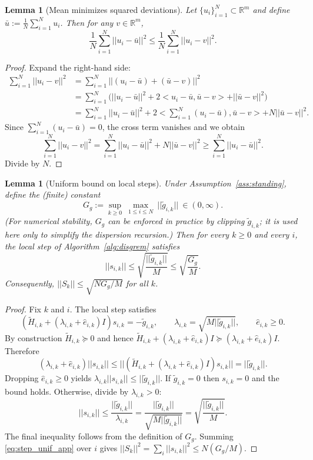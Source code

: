 \documentclass[11pt,a4paper]{article}
\def\norm#1{||#1||}%
\def\ip#1#2{<#1,#2>}%
\newtheorem{lemma}[theorem]{Lemma}
\newcommand{\R}{\mathbb{R}}
\newcommand{\ip}[2]{\left\langle #1,#2\right\rangle}
\newcommand{\norm}[1]{\left\|#1\right\|}
\begin{document}
	\begin{lemma}[Mean minimizes squared deviations]\label{lem:mean_minimizer_app}
		Let $\{u_i\}_{i=1}^N\subset\R^m$ and define $\bar u:=\frac1N\sum_{i=1}^N u_i$.
		Then for any $v\in\R^m$,
		\[
		\frac1N\sum_{i=1}^N\norm{u_i-\bar u}^2\le \frac1N\sum_{i=1}^N\norm{u_i-v}^2.
		\]
	\end{lemma}
	\begin{proof}
		Expand the right-hand side:
		\begin{align*}
			\sum_{i=1}^N\norm{u_i-v}^2
			&=\sum_{i=1}^N\norm{(u_i-\bar u)+(\bar u-v)}^2\\
			&=\sum_{i=1}^N\Big(\norm{u_i-\bar u}^2+2\ip{u_i-\bar u}{\bar u-v}+\norm{\bar u-v}^2\Big)\\
			&=\sum_{i=1}^N\norm{u_i-\bar u}^2+2\ip{\sum_{i=1}^N(u_i-\bar u)}{\bar u-v}+N\norm{\bar u-v}^2.
		\end{align*}
		Since $\sum_{i=1}^N(u_i-\bar u)=0$, the cross term vanishes and we obtain
		\[
		\sum_{i=1}^N\norm{u_i-v}^2=\sum_{i=1}^N\norm{u_i-\bar u}^2+N\norm{\bar u-v}^2\ge \sum_{i=1}^N\norm{u_i-\bar u}^2.
		\]
		Divide by $N$.
	\end{proof}
	
	\begin{lemma}[Uniform bound on local steps]\label{lem:step_bound_app}
		Under Assumption~\ref{ass:standing}, define the (finite) constant
		\[
		G_g:=\sup_{k\ge 0}\ \max_{1\le i\le N}\ \norm{\tilde g_{i,k}}\ \in(0,\infty).
		\]
		(For numerical stability, $G_g$ can be enforced in practice by clipping $\tilde g_{i,k}$; it is used here only to simplify the dispersion recursion.)
		Then for every $k\ge 0$ and every $i$, the local step of Algorithm~\ref{alg:disgrem} satisfies
		\begin{equation}\label{eq:step_unif_app}
			\norm{s_{i,k}}\le \sqrt{\frac{\norm{\tilde g_{i,k}}}{M}}\le \sqrt{\frac{G_g}{M}}.
		\end{equation}
		Consequently, $\norm{S_k}\le \sqrt{NG_g/M}$ for all $k$.
	\end{lemma}
	\begin{proof}
		Fix $k$ and $i$. The local step satisfies
		\[
		(\tilde H_{i,k}+(\lambda_{i,k}+\hat e_{i,k})I)s_{i,k}=-\tilde g_{i,k},
		\qquad \lambda_{i,k}=\sqrt{M\norm{\tilde g_{i,k}}},\qquad \hat e_{i,k}\ge 0.
		\]
		By construction $\tilde H_{i,k}\succeq 0$ and hence
		$\tilde H_{i,k}+(\lambda_{i,k}+\hat e_{i,k})I\succeq (\lambda_{i,k}+\hat e_{i,k})I$.
		Therefore
		\[
		(\lambda_{i,k}+\hat e_{i,k})\norm{s_{i,k}}
		\le \norm{(\tilde H_{i,k}+(\lambda_{i,k}+\hat e_{i,k})I)s_{i,k}}=\norm{\tilde g_{i,k}}.
		\]
		Dropping $\hat e_{i,k}\ge 0$ yields $\lambda_{i,k}\norm{s_{i,k}}\le \norm{\tilde g_{i,k}}$.
		If $\tilde g_{i,k}=0$ then $s_{i,k}=0$ and the bound holds. Otherwise, divide by $\lambda_{i,k}>0$:
		\[
		\norm{s_{i,k}}\le \frac{\norm{\tilde g_{i,k}}}{\lambda_{i,k}}=\frac{\norm{\tilde g_{i,k}}}{\sqrt{M\norm{\tilde g_{i,k}}}}=\sqrt{\frac{\norm{\tilde g_{i,k}}}{M}}.
		\]
		The final inequality follows from the definition of $G_g$.
		Summing \eqref{eq:step_unif_app} over $i$ gives $\norm{S_k}^2=\sum_i\norm{s_{i,k}}^2\le N(G_g/M)$.
	\end{proof}
	
\end{document}
